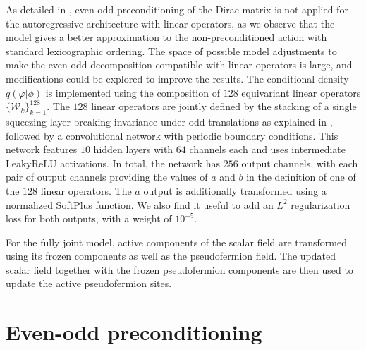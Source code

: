 \documentclass[aps,prd,twocolumn,nofootinbib,superscriptaddress,preprintnumbers]{revtex4-1}
\begin{document}
As detailed in , even-odd preconditioning of the Dirac matrix is not applied for the autoregressive architecture with linear operators, as we observe that the model gives a better approximation to the non-preconditioned action with standard lexicographic ordering. The space of possible model adjustments to make the even-odd decomposition compatible with linear operators is large, and modifications could be explored to improve the results. The conditional density $q(\varphi|\phi)$ is implemented using the composition of $128$ equivariant linear operators $\{ \mathcal{W}_k \}_{k=1}^{128}$. The $128$ linear operators are jointly defined by the stacking of a single squeezing layer breaking invariance under odd translations as explained in , followed by a convolutional network with periodic boundary conditions. This network features $10$ hidden layers with $64$ channels each and uses intermediate LeakyReLU activations. In total, the network has $256$ output channels, with each pair of output channels providing the values of $a$ and $b$ in the definition of one of the $128$ linear operators. The $a$ output is additionally transformed using a normalized SoftPlus function. We also find it useful to add an $L^2$ regularization loss for both outputs, with a weight of $10^{-5}$.

For the fully joint model, active components of the scalar field are transformed using its frozen components as well as the pseudofermion field. The updated scalar field together with the frozen pseudofermion components are then used to update the active pseudofermion sites.


\section{Even-odd preconditioning}
\label{app:even-odd}
\end{document}

